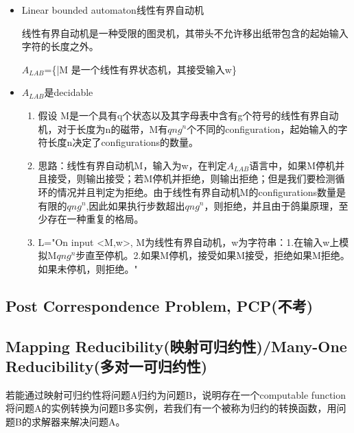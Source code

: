 \documentclass[UTF8]{ctexart}
\begin{document}
\begin{itemize}
    \item Linear bounded automaton线性有界自动机
    
    线性有界自动机是一种受限的图灵机，其带头不允许移出纸带包含的起始输入字符的长度之外。

    $A_{LAB}$=\{<M,w>|M 是一个线性有界状态机，其接受输入w\}

    \item $A_{LAB}$是decidable
    
    \begin{enumerate}
        \item 假设 M是一个具有q个状态以及其字母表中含有g个符号的线性有界自动机，对于长度为n的磁带，M有$qng^n$个不同的configuration，起始输入的字符长度n决定了configurations的数量。
        \item 思路：线性有界自动机M，输入为w，在判定$A_{LAB}$语言中，如果M停机并且接受，则输出接受；若M停机并拒绝，则输出拒绝；但是我们要检测循环的情况并且判定为拒绝。由于线性有界自动机M的configurations数量是有限的$qng^n$,因此如果执行步数超出$qng^n$，则拒绝，并且由于鸽巢原理，至少存在一种重复的格局。
        \item L="On input <M,w>, M为线性有界自动机，w为字符串：1.在输入w上模拟M$qng^n$步直至停机。2.如果M停机，接受如果M接受，拒绝如果M拒绝。如果未停机，则拒绝。"
    \end{enumerate}

\end{itemize}

\subsection{Post Correspondence Problem, PCP(不考)}

\subsection{Mapping Reducibility(映射可归约性)/Many-One Reducibility(多对一可归约性)}

若能通过映射可归约性将问题A归约为问题B，说明存在一个computable function将问题A的实例转换为问题B多实例，若我们有一个被称为归约的转换函数，用问题B的求解器来解决问题A。
\end{document}

